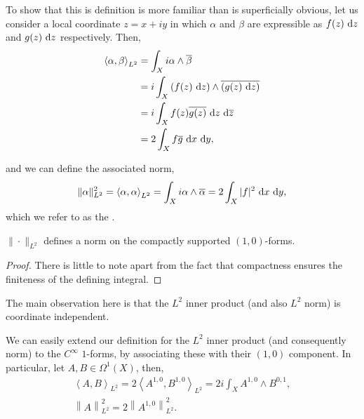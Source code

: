 To show that this is definition is more familiar than is superficially obvious,
let us consider a local coordinate $ z=x+iy $ in which $ \alpha $ and $ \beta $
are expressible as $ f(z) \operatorname{\, d\!}{z} $ and $ g(z) \operatorname{\, d\!}{z} $ respectively. Then,
\begin{align*}
	\left\langle \alpha, \beta \right\rangle _{L^2} & = \int_{X}{i \alpha\wedge
	\overline{\beta}}                                                           \\
	                                                & = i\int_{X}{\left( f(z)
		\operatorname{\, d\!}{z} \right)\wedge
		\overline{\left( g(z)\operatorname{\, d\!}{z}
	\right)}}                                                                   \\
	                                                & = i\int_{X}{f(z)
	\overline{g(z)}\operatorname{\, d\!}{z}\operatorname{\, d\!}{\overline{z}}}                                       \\
	                                                & = 2\int_{X}{f
		\overline{g}\operatorname{\, d\!}{x}\operatorname{\, d\!}{y}},
\end{align*}

and we can define the associated norm,
\begin{align*}
	\|\alpha\|_{L^2}^{2} = \left\langle \alpha,\alpha \right\rangle _{L^2} =
	\int_{X}{i \alpha \wedge \overline{\alpha}} = 2\int_{X}{|f|^{2}\operatorname{\, d\!}{x}\operatorname{\, d\!}{y}},
\end{align*}
which we refer to as the .

\begin{lemma}
	$ \|\cdot \|_{L^2} $ defines a norm on the compactly supported $ (1,0)
	$-forms.
	\begin{proof}
		There is little to note apart from the fact that compactness ensures the
		finiteness of the defining integral.
	\end{proof}
\end{lemma}

\begin{remark}
	The main observation here is that the $ L^2 $ inner product (and also $ L^{2}
	$ norm) is coordinate independent.
\end{remark}

We can easily extend our definition for the $ L^2 $ inner product (and
consequently norm) to the $ C ^{\infty} $ $ 1 $-forms, by associating these with
their $ (1,0) $ component. In particular, let $ A,B \in \Omega^1(X) $, then,
\begin{gather*}
	\left\langle A,B \right\rangle _{L^2} = 2 \left\langle A ^{1,0}, B ^{1,0}
	\right\rangle _{L^2} = 2i \int_{X}{A ^{1,0}\wedge B ^{0,1}},\\
	\left\|A\right\|_{L^2}^{2} = 2\left\|A^{1,0}\right\|_{L^2}^{2}.
\end{gather*}

